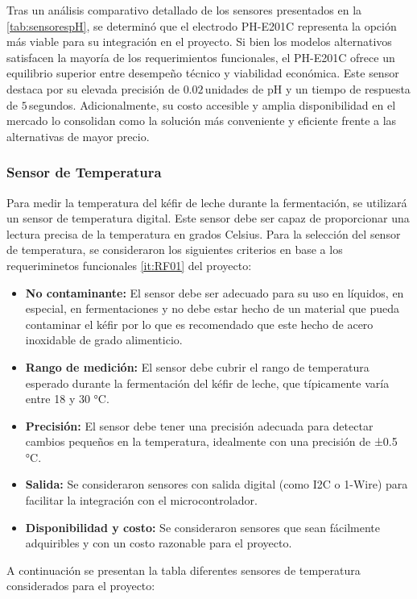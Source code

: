 Tras un análisis comparativo detallado de los sensores presentados en 
la \cref{tab:sensorespH}, se determinó que el electrodo
PH-E201C \cite{zotero-item-47} representa la opción más viable
para su integración en el proyecto. Si bien los modelos alternativos 
satisfacen la mayoría de los requerimientos funcionales, el PH-E201C 
ofrece un equilibrio superior entre desempeño técnico y viabilidad económica. 
Este sensor destaca por su elevada precisión de $0.02$\,unidades de pH y un 
tiempo de respuesta de $5$\,segundos. Adicionalmente, su costo accesible y 
amplia disponibilidad en el mercado lo consolidan como la solución más 
conveniente y eficiente frente a las alternativas de mayor precio.

\subsubsection{Sensor de Temperatura}
Para medir la temperatura del kéfir de leche durante la fermentación, se
utilizará un sensor de temperatura digital. Este sensor debe ser capaz de
proporcionar una lectura precisa de la temperatura en grados Celsius.
Para la selección del sensor de temperatura, se consideraron los siguientes
criterios en base a los requeriminetos funcionales \ref{it:RF01} del
proyecto:
\begin{itemize}
    \item \textbf{No contaminante:} El sensor debe ser adecuado para su uso en
    líquidos, en especial, en fermentaciones y no debe estar hecho de un material que pueda
    contaminar el kéfir por lo que es recomendado que este hecho de acero inoxidable de grado alimenticio.
    \item \textbf{Rango de medición:} El sensor debe cubrir el rango de temperatura
    esperado durante la fermentación del kéfir de leche, que típicamente varía entre
    18 y 30 °C.
    \item \textbf{Precisión:} El sensor debe tener una precisión adecuada para detectar
    cambios pequeños en la temperatura, idealmente con una precisión de ±0.5 °C.
    \item \textbf{Salida:} Se consideraron sensores con salida digital (como I2C o
    1-Wire) para facilitar la integración con el microcontrolador.
    \item \textbf{Disponibilidad y costo:} Se consideraron sensores que sean fácilmente
    adquiribles y con un costo razonable para el proyecto.
\end{itemize}
A continuación se presentan la tabla diferentes sensores de temperatura
considerados para el proyecto:

